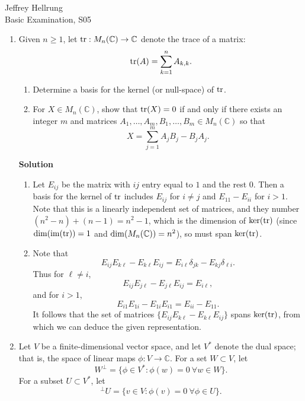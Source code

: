 \documentclass{article}
\def\tr{\mathop{\rm tr}\nolimits}
\def\ker{\mathop{\rm ker}\nolimits}
\def\dim{\mathop{\rm dim}\nolimits}
\def\im{\mathop{\rm im}\nolimits}
\begin{document}
\begin{flushright}
Jeffrey Hellrung \\
Basic Examination, S05 \\
\end{flushright}


\begin{enumerate}

\item Given \(n \geq 1\), let \(\tr : M_n(\mathbb{C}) \to \mathbb{C}\) denote the trace of a matrix:
\[\tr(A) = \sum_{k = 1}^n A_{k,k}.\]

\begin{enumerate}
\item Determine a basis for the kernel (or null-space) of \(\tr\).

\item For \(X \in M_n(\mathbb{C})\), show that \(\tr(X) = 0\) if and only if there exists an integer \(m\) and matrices \(A_1, \ldots, A_m, B_1, \ldots, B_m \in M_n(\mathbb{C})\) so that
\[X = \sum_{j = 1}^m A_j B_j - B_j A_j.\]

\end{enumerate}

{\bf Solution}

\begin{enumerate}
\item Let \(E_{ij}\) be the matrix with \(ij\) entry equal to \(1\) and the rest \(0\).  Then a basis for the kernel of \(\tr\) includes \(E_{ij}\) for \(i \neq j\) and \(E_{11} - E_{ii}\) for \(i > 1\).  Note that this is a linearly independent set of matrices, and they number \((n^2 - n) + (n - 1) = n^2 - 1\), which is the dimension of \(\ker(\tr)\) (since \(\dim(\im(\tr)) = 1\) and \(\dim(M_n(\mathbb{C})) = n^2\)), so must span \(\ker(\tr)\).

\item Note that
\[E_{ij} E_{k\ell} - E_{k\ell} E_{ij} = E_{i\ell} \delta_{jk} - E_{kj} \delta_{\ell i}.\]
Thus for \(\ell \neq i\),
\[E_{ij} E_{j\ell} - E_{j\ell} E_{ij} = E_{i\ell},\]
and for \(i > 1\),
\[E_{i1} E_{1i} - E_{1i} E_{i1} = E_{ii} - E_{11}.\]
It follows that the set of matrices \(\{E_{ij} E_{k\ell} - E_{k\ell} E_{ij}\}\) spans \(\ker(\tr)\), from which we can deduce the given representation.

\end{enumerate}



\item  Let \(V\) be a finite-dimensional vector space, and let \(V^*\) denote the dual space; that is, the space of linear maps \(\phi : V \to \mathbb{C}\).  For a set \(W \subset V\), let
\[W^{\perp} = \{\phi \in V^* : \phi(w) = 0 \ \forall w \in W\}.\]
For a subset \(U \subset V^*\), let
\[^{\perp}U = \{v \in V : \phi(v) = 0 \ \forall \phi \in U\}.\]


\end{enumerate}
\end{document}
